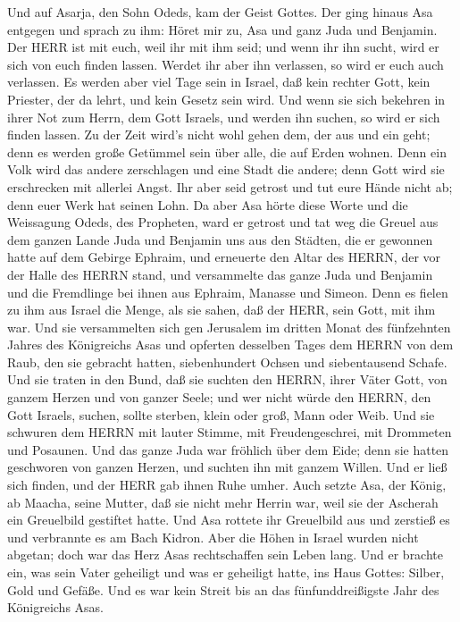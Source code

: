  Und auf Asarja, den Sohn Odeds, kam der Geist Gottes.
 Der ging hinaus Asa entgegen und sprach zu ihm: Höret mir
zu, Asa und ganz Juda und Benjamin. Der HERR ist mit euch, weil ihr mit
ihm seid; und wenn ihr ihn sucht, wird er sich von euch finden lassen.
Werdet ihr aber ihn verlassen, so wird er euch auch verlassen.
 Es werden aber viel Tage sein in Israel, daß kein rechter
Gott, kein Priester, der da lehrt, und kein Gesetz sein wird.
 Und wenn sie sich bekehren in ihrer Not zum Herrn, dem Gott
Israels, und werden ihn suchen, so wird er sich finden lassen.
 Zu der Zeit wird's nicht wohl gehen dem, der aus und ein
geht; denn es werden große Getümmel sein über alle, die auf Erden
wohnen.  Denn ein Volk wird das andere zerschlagen und eine
Stadt die andere; denn Gott wird sie erschrecken mit allerlei Angst.
 Ihr aber seid getrost und tut eure Hände nicht ab; denn
euer Werk hat seinen Lohn.  Da aber Asa hörte diese Worte
und die Weissagung Odeds, des Propheten, ward er getrost und tat weg die
Greuel aus dem ganzen Lande Juda und Benjamin uns aus den Städten, die
er gewonnen hatte auf dem Gebirge Ephraim, und erneuerte den Altar des
HERRN, der vor der Halle des HERRN stand,  und versammelte
das ganze Juda und Benjamin und die Fremdlinge bei ihnen aus Ephraim,
Manasse und Simeon. Denn es fielen zu ihm aus Israel die Menge, als sie
sahen, daß der HERR, sein Gott, mit ihm war.  Und sie
versammelten sich gen Jerusalem im dritten Monat des fünfzehnten Jahres
des Königreichs Asas  und opferten desselben Tages dem
HERRN von dem Raub, den sie gebracht hatten, siebenhundert Ochsen und
siebentausend Schafe.  Und sie traten in den Bund, daß sie
suchten den HERRN, ihrer Väter Gott, von ganzem Herzen und von ganzer
Seele;  und wer nicht würde den HERRN, den Gott Israels,
suchen, sollte sterben, klein oder groß, Mann oder Weib. 
Und sie schwuren dem HERRN mit lauter Stimme, mit Freudengeschrei, mit
Drommeten und Posaunen.  Und das ganze Juda war fröhlich
über dem Eide; denn sie hatten geschworen von ganzen Herzen, und suchten
ihn mit ganzem Willen. Und er ließ sich finden, und der HERR gab ihnen
Ruhe umher.  Auch setzte Asa, der König, ab Maacha, seine
Mutter, daß sie nicht mehr Herrin war, weil sie der Ascherah ein
Greuelbild gestiftet hatte. Und Asa rottete ihr Greuelbild aus und
zerstieß es und verbrannte es am Bach Kidron.  Aber die
Höhen in Israel wurden nicht abgetan; doch war das Herz Asas
rechtschaffen sein Leben lang.  Und er brachte ein, was
sein Vater geheiligt und was er geheiligt hatte, ins Haus Gottes:
Silber, Gold und Gefäße.  Und es war kein Streit bis an das
fünfunddreißigste Jahr des Königreichs Asas.

